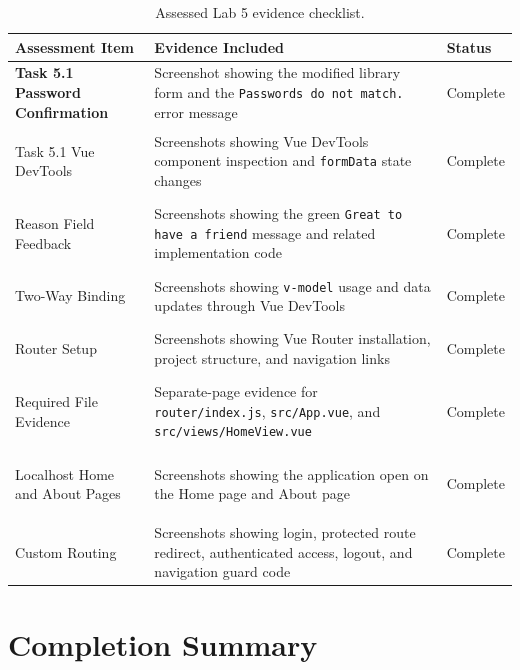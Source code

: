 \documentclass[a4paper,11pt]{article}
\begin{document}
\begin{table}[H]
\centering
\begin{tabularx}
{0.96\textwidth}
{|>{\bfseries}p{3.4cm}|X|>{\centering\arraybackslash}p{2.2cm}|}
\hline
Assessment Item & Evidence Included & Status \\ \hline

Task 5.1 Password Confirmation
& Screenshot showing the modified library form and the
\texttt{Passwords do not match.} error message
& Complete \\ \hline

Task 5.1 Vue DevTools
& Screenshots showing Vue DevTools component inspection and
\texttt{formData} state changes
& Complete \\ \hline

Reason Field Feedback
& Screenshots showing the green \texttt{Great to have a friend}
message and related implementation code
& Complete \\ \hline

Two-Way Binding
& Screenshots showing \texttt{v-model} usage and data updates through
Vue DevTools
& Complete \\ \hline

Router Setup
& Screenshots showing Vue Router installation, project structure, and
navigation links
& Complete \\ \hline

Required File Evidence
& Separate-page evidence for \texttt{router/index.js},
\texttt{src/App.vue}, and \texttt{src/views/HomeView.vue}
& Complete \\ \hline

Localhost Home and About Pages
& Screenshots showing the application open on the Home page and About
page
& Complete \\ \hline

Custom Routing
& Screenshots showing login, protected route redirect, authenticated
access, logout, and navigation guard code
& Complete \\ \hline

\end{tabularx}
\caption{Assessed Lab 5 evidence checklist.}
\label{tab:evidence-checklist}
\end{table}

\section{Completion Summary}
\end{document}
